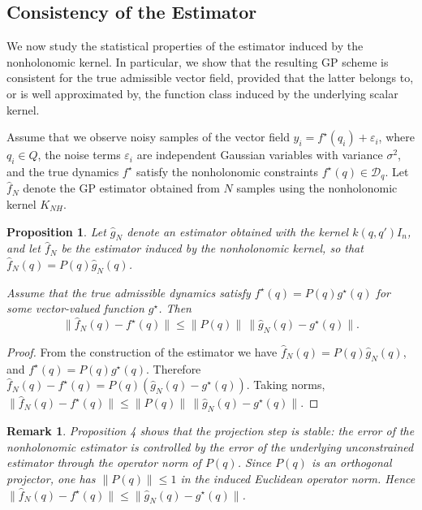 \documentclass[letterpaper, 10 pt, conference]{ieeeconf}
\newtheorem{remark}{Remark}
\newtheorem{proposition}{Proposition}
\begin{document}
\subsection{Consistency of the Estimator}

We now study the statistical properties of the estimator induced by the nonholonomic kernel. In particular, we show that the resulting GP scheme is consistent for the true admissible vector field, provided that the latter belongs to, or is well approximated by, the function class induced by the underlying scalar kernel.

Assume that we observe noisy samples of the vector field $y_i = f^\star(q_i) + \varepsilon_i$,
where $q_i \in Q$, the noise terms $\varepsilon_i$ are independent Gaussian variables with variance $\sigma^2$, and the true dynamics $f^\star$ satisfy the nonholonomic constraints $f^\star(q) \in \mathcal D_q$. Let $\hat f_N$ denote the GP estimator obtained from $N$ samples using the nonholonomic kernel $K_{NH}$.




\begin{proposition}
Let $\hat g_N$ denote an estimator obtained with the kernel $k(q,q')I_n$, and let $\hat f_N$ be the estimator induced by the nonholonomic kernel, so that $\hat f_N(q)=P(q)\hat g_N(q)$.

Assume that the true admissible dynamics satisfy $f^\star(q)=P(q)g^\star(q)$ for some vector-valued function $g^\star$. Then
\begin{equation}
\|\hat f_N(q)-f^\star(q)\|
\le
\|P(q)\|\,\|\hat g_N(q)-g^\star(q)\|.
\label{eq:projection_bound}
\end{equation}
\end{proposition}

\begin{proof}
From the construction of the estimator we have $\hat f_N(q)=P(q)\hat g_N(q)$, and $f^\star(q)=P(q)g^\star(q)$. Therefore
$\hat f_N(q)-f^\star(q)
=
P(q)(\hat g_N(q)-g^\star(q))$. Taking norms, $\|\hat f_N(q)-f^\star(q)\|
\le
\|P(q)\|\,\|\hat g_N(q)-g^\star(q)\|$. \end{proof}

\begin{remark}Proposition 4 shows that the projection step is stable: the error of the nonholonomic estimator is controlled by the error of the underlying unconstrained estimator through the operator norm of $P(q)$. Since $P(q)$ is an orthogonal projector, one has $\|P(q)\|\le 1$ in the induced Euclidean operator norm. Hence $\|\hat f_N(q)-f^\star(q)\|
\le
\|\hat g_N(q)-g^\star(q)\|$.\end{remark}
\end{document}
